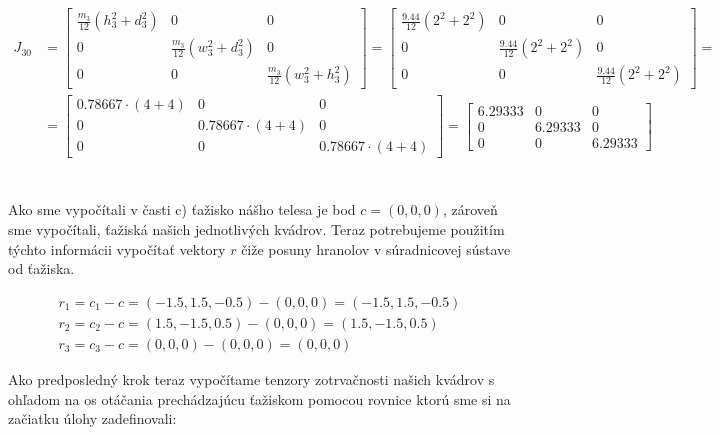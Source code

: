 \documentclass[a4paper]{article}
\begin{document}
\begin{align*}
		J_{30} &= \begin{bmatrix}
			\frac{m_3}{12}(h_3^2 + d_3^2) & 0 & 0 \\
			0 & \frac{m_3}{12}(w_3^2 + d_3^2) & 0 \\
			0 & 0 & \frac{m_3}{12}(w_3^2 + h_3^2)
		\end{bmatrix} =
		\begin{bmatrix}
			\frac{9.44}{12}(2^2 + 2^2) & 0 & 0 \\
			0 & \frac{9.44}{12}(2^2 + 2^2) & 0 \\
			0 & 0 & \frac{9.44}{12}(2^2 + 2^2)
		\end{bmatrix} =
		\\
		&= \begin{bmatrix}
			0.78667 \cdot (4 + 4) & 0 & 0 \\
			0 & 0.78667 \cdot (4 + 4) & 0 \\
			0 & 0 & 0.78667 \cdot (4 + 4)
		\end{bmatrix} =
		\begin{bmatrix}
			6.29333 & 0 & 0 \\
			0 & 6.29333 & 0 \\
			0 & 0 & 6.29333
		\end{bmatrix}
	\end{align*} 
	\\
	\\
	Ako sme  vypočítali v časti c) ťažisko nášho telesa je bod $c=(0,0,0)$, zároveň sme vypočítali, ťažiská našich jednotlivých kvádrov. Teraz potrebujeme použitím týchto informácii vypočítať vektory $r$ čiže posuny hranolov v súradnicovej sústave od ťažiska.

	\begin{align*}
		r_1 = c_1 - c = (-1.5, 1.5, -0.5) - (0, 0, 0) = (-1.5, 1.5, -0.5)
		\\
		r_2 = c_2 - c = (1.5, -1.5, 0.5) - (0, 0, 0) = (1.5, -1.5, 0.5)
		\\
		r_3 = c_3 - c = (0, 0, 0) - (0, 0, 0) = (0, 0, 0)
	\end{align*}
	
	Ako predposledný krok teraz vypočítame tenzory zotrvačnosti našich kvádrov s ohľadom na os otáčania prechádzajúcu ťažiskom pomocou rovnice ktorú sme si na začiatku úlohy zadefinovali:
	
\end{document}
